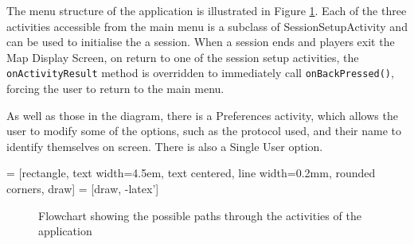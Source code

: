 The menu structure of the application is illustrated in Figure \ref{fig:menu_structure}. Each of the three activities accessible from the main menu is a subclass of SessionSetupActivity and can be used to initialise the a session. When a session ends and players exit the Map Display Screen, on return to one of the session setup activities, the {\tt onActivityResult} method is overridden to immediately call {\tt onBackPressed()}, forcing the user to return to the main menu.

As well as those in the diagram, there is a Preferences activity, which allows the user to modify some of the options, such as the protocol used, and their name to identify themselves on screen. There is also a Single User option. 

 = [rectangle, text width=4.5em, text centered, line width=0.2mm, rounded corners, draw]
 = [draw, -latex']
\begin{figure}[ht]
\centering
{}
\caption{Flowchart showing the possible paths through the activities of the application}
\label{fig:menu_structure}
\end{figure}

